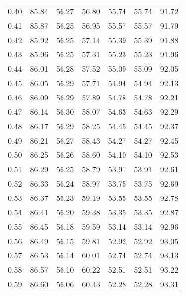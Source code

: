 \begin{tabular}{|c|c|c|c|c|c|c|}
      0.40 &     85.84 &     56.27 &      56.80 &   55.74 &      55.74 &         91.72 \\
      0.41 &     85.87 &     56.25 &      56.95 &   55.57 &      55.57 &         91.79 \\
      0.42 &     85.92 &     56.25 &      57.14 &   55.39 &      55.39 &         91.88 \\
      0.43 &     85.96 &     56.25 &      57.31 &   55.23 &      55.23 &         91.96 \\
      0.44 &     86.01 &     56.28 &      57.52 &   55.09 &      55.09 &         92.05 \\
      0.45 &     86.05 &     56.29 &      57.71 &   54.94 &      54.94 &         92.13 \\
      0.46 &     86.09 &     56.29 &      57.89 &   54.78 &      54.78 &         92.21 \\
      0.47 &     86.14 &     56.30 &      58.07 &   54.63 &      54.63 &         92.29 \\
      0.48 &     86.17 &     56.29 &      58.25 &   54.45 &      54.45 &         92.37 \\
      0.49 &     86.21 &     56.27 &      58.43 &   54.27 &      54.27 &         92.45 \\
      0.50 &     86.25 &     56.26 &      58.60 &   54.10 &      54.10 &         92.53 \\
      0.51 &     86.29 &     56.25 &      58.79 &   53.91 &      53.91 &         92.61 \\
      0.52 &     86.33 &     56.24 &      58.97 &   53.75 &      53.75 &         92.69 \\
      0.53 &     86.37 &     56.23 &      59.19 &   53.55 &      53.55 &         92.78 \\
      0.54 &     86.41 &     56.20 &      59.38 &   53.35 &      53.35 &         92.87 \\
      0.55 &     86.45 &     56.18 &      59.59 &   53.14 &      53.14 &         92.96 \\
      0.56 &     86.49 &     56.15 &      59.81 &   52.92 &      52.92 &         93.05 \\
      0.57 &     86.53 &     56.14 &      60.01 &   52.74 &      52.74 &         93.13 \\
      0.58 &     86.57 &     56.10 &      60.22 &   52.51 &      52.51 &         93.22 \\
      0.59 &     86.60 &     56.06 &      60.43 &   52.28 &      52.28 &         93.31 \\

\end{tabular}
